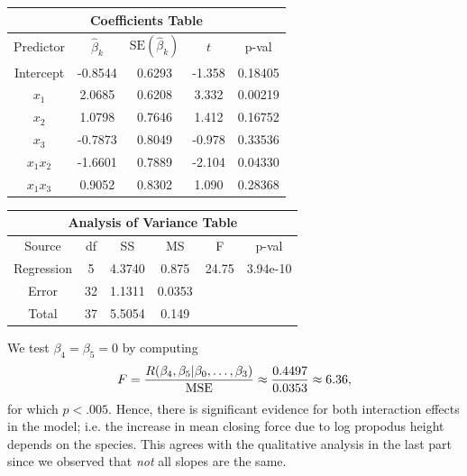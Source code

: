 \documentclass{homework}
\begin{document}
\begin{longproblem}
  \begin{solution}
{\small
\begin{minipage}{.50\textwidth}
\begin{tabular}{c c c c c}
\multicolumn{5}{c}{\bf Coefficients Table} \\ \hline
Predictor & $\hat \beta_k$ & $\mathrm{SE}(\hat \beta_k)$ & $t$ & p-val \\ \hline
Intercept & -0.8544  & 0.6293  & -1.358  & 0.18405   \\
$x_1$     &  2.0685  & 0.6208  &  3.332  & 0.00219   \\ 
$x_2$     &  1.0798  & 0.7646  &  1.412  & 0.16752   \\
$x_3$     & -0.7873  & 0.8049  & -0.978  & 0.33536   \\
$x_1x_2$  & -1.6601  & 0.7889  & -2.104  & 0.04330   \\
$x_1x_3$  &  0.9052  & 0.8302  &  1.090  & 0.28368   \\\hline
\end{tabular}
\end{minipage}
\begin{minipage}{.4 \textwidth} 
\begin{center}
\begin{tabular}{c c c c c c}
\multicolumn{6}{c}{\bf Analysis of Variance Table}\\
\hline
Source     & df     & SS        & MS        & F        & p-val   \\ \hline
Regression & 5      & 4.3740    & 0.875     & 24.75    &3.94e-10 \\
Error      & 32     & 1.1311    & 0.0353    &          &         \\
Total      & 37     & 5.5054    & 0.149     &          &         \\ \hline
\end{tabular}
\end{center}
\end{minipage}
}

We test $\beta_4=\beta_5=0$ by computing
$$
  F = \frac{R(\beta_4,\beta_5|\beta_0,\dots,\beta_3)}{\mathrm{MSE}} \approx \frac{0.4497}{0.0353} \approx 6.36,
$$
for which $p < .005$.  Hence, there is significant evidence for both
  interaction effects in the model; i.e. the increase in mean closing force due
  to log propodus height depends on the species.  This agrees with the
  qualitative analysis in the last part since we observed that \emph{not} all
  slopes are the same.
\end{solution}


\end{longproblem}
\end{document}

